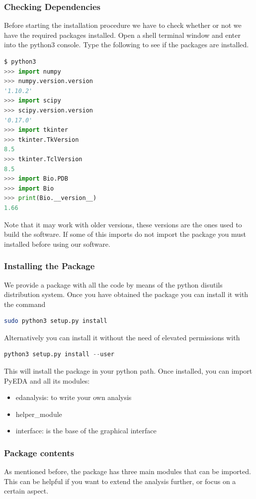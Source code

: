 \documentclass[12pt]{article}
\begin{document}
\subsubsection{Checking Dependencies}
Before starting the installation procedure we have to check whether or not we have the required packages installed. Open a shell terminal window and enter into the python3 console. Type the following to see if the packages are installed.
\begin{lstlisting}[language=python]
$ python3
>>> import numpy
>>> numpy.version.version
'1.10.2'
>>> import scipy
>>> scipy.version.version
'0.17.0'
>>> import tkinter
>>> tkinter.TkVersion
8.5
>>> tkinter.TclVersion
8.5
>>> import Bio.PDB
>>> import Bio
>>> print(Bio.__version__)
1.66
\end{lstlisting}
Note that it may work with older versions, these versions are the ones used to build the software. If some of this imports do not import the package you must installed before using our software. 

\subsubsection{Installing the Package}
We provide a package with all the code by means of the python disutils distribution system. Once you have obtained the package you can install it with the command
\begin{lstlisting}[language=Bash]
sudo python3 setup.py install
\end{lstlisting}
Alternatively you can install it without the need of elevated permissions with 
\begin{lstlisting}[language=Python]
python3 setup.py install --user
\end{lstlisting}

This will install the package in your python path. Once installed, you can import PyEDA and all its modules:
\begin{itemize}
\item edanalysis: to write your own analysis
\item helper\_module
\item interface: is the base of the graphical interface
\end{itemize} 

\subsubsection{Package contents}
As mentioned before, the package has three main modules that can be imported. This can be helpful if you want to extend the analysis further, or focus on a certain aspect.\\
\end{document}
